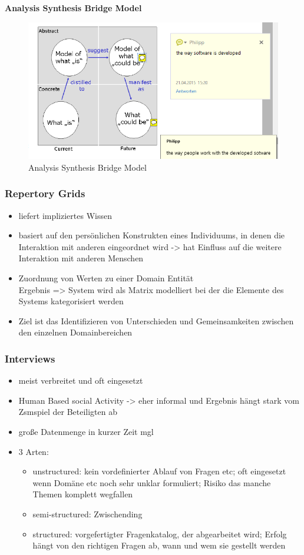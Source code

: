 \newpage
\textbf{Analysis Synthesis Bridge Model}
\begin{figure}[!h]
	\centering
	\includegraphics[scale=0.6]{img/analysis_synthesis_bridge_model.png}
	\caption{Analysis Synthesis Bridge Model}
\end{figure}


\subsubsection{Repertory Grids}
\begin{itemize}
	\item liefert impliziertes Wissen
	\item basiert auf den persönlichen Konstrukten eines Individuums, in denen die Interaktion mit anderen eingeordnet wird -> hat Einfluss auf die weitere Interaktion mit anderen Menschen
	\item Zuordnung von Werten zu einer Domain Entität\\
	Ergebnis => System wird als Matrix modelliert bei der die Elemente des Systems kategorisiert werden
	\item Ziel ist das Identifizieren von Unterschieden und Gemeinsamkeiten zwischen den einzelnen Domainbereichen
\end{itemize}

\subsubsection{Interviews}
\begin{itemize}
	\item meist verbreitet und oft eingesetzt
	\item Human Based social Activity -> eher informal und Ergebnis hängt stark vom Zsmspiel der Beteiligten ab
	\item große Datenmenge in kurzer Zeit mgl
	\item 3 Arten:
	\begin{itemize}
		\item unstructured: kein vordefinierter Ablauf von Fragen etc; oft eingesetzt wenn Domäne etc noch sehr unklar formuliert; Risiko das manche Themen komplett wegfallen
		\item semi-structured: Zwischending
		\item structured: vorgefertigter Fragenkatalog, der abgearbeitet wird; Erfolg hängt von den richtigen Fragen ab, wann und wem sie gestellt werden
	\end{itemize}
\end{itemize}

